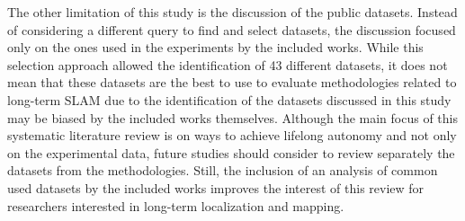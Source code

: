 The other limitation of this study is the discussion of the public datasets. Instead of considering a different query to find and select datasets, the discussion focused only on the ones used in the experiments by the included works. While this selection approach allowed the identification of 43 different datasets, it does not mean that these datasets are the best to use to evaluate methodologies related to long-term SLAM due to the identification of the datasets discussed in this study may be biased by the included works themselves. Although the main focus of this systematic literature review is on ways to achieve lifelong autonomy and not only on the experimental data, future studies should consider to review separately the datasets from the methodologies. Still, the inclusion of an analysis of common used datasets by the included works improves the interest of this review for researchers interested in long-term localization and mapping.
